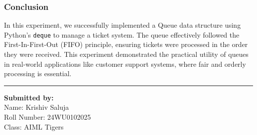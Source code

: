 \documentclass[a4paper,12pt]{article}
\begin{document}
\subsubsection*{Conclusion}
In this experiment, we successfully implemented a Queue data structure using Python's \texttt{deque} to manage a ticket system. The queue effectively followed the First-In-First-Out (FIFO) principle, ensuring tickets were processed in the order they were received. This experiment demonstrated the practical utility of queues in real-world applications like customer support systems, where fair and orderly processing is essential.

\noindent\rule{\textwidth}{1pt}
\vspace{1cm}
\begin{flushleft}
    \textbf{Submitted by:}\\
        Name: Krishiv Saluja\\
        Roll Number: 24WU0102025\\
        Class: AIML Tigers
\end{flushleft}
\end{document}
